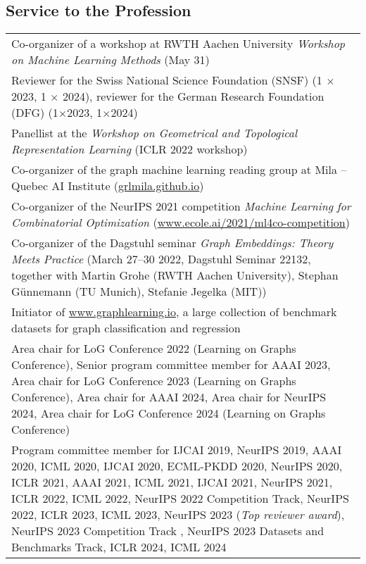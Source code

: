 \documentclass[11pt, a4paper, DIV=14, headings=small]{scrartcl}
\begin{document}
	\subsection*{Service to the Profession}
	\begin{longtabu}{p{14.5cm}} 
		Co-organizer of a workshop at RWTH Aachen University \emph{Workshop on Machine Learning Methods} (May 31) \\
	
	    Reviewer for the Swiss National Science Foundation (SNSF) (1 $\times$ 2023, 1 $\times$ 2024), reviewer for the German Research Foundation (DFG) (1$\times$2023, 1$\times$2024) \\[2.5em]
	    
		Panellist at the \emph{Workshop on Geometrical and Topological Representation Learning} (ICLR 2022 workshop) \\
		Co-organizer of the graph machine learning reading group at Mila -- Quebec AI Institute (\url{grlmila.github.io}) \\
		
		Co-organizer of the NeurIPS 2021 competition \emph{Machine Learning for Combinatorial Optimization} (\url{www.ecole.ai/2021/ml4co-competition}) \\
		
		Co-organizer of the Dagstuhl seminar \emph{Graph Embeddings: Theory Meets Practice} (March 27–30 2022, Dagstuhl Seminar 22132, together with Martin Grohe (RWTH Aachen University), Stephan Günnemann (TU Munich), Stefanie Jegelka (MIT)) \\
		
		Initiator of \url{www.graphlearning.io}, a large collection of benchmark datasets for graph classification and regression \\
		
		Area chair for LoG Conference 2022 (Learning on Graphs Conference), Senior program committee member for AAAI 2023, Area chair for LoG Conference 2023 (Learning on Graphs Conference), Area chair for AAAI 2024, Area chair for NeurIPS 2024, Area chair for LoG Conference 2024 (Learning on Graphs Conference) \\
		
		Program committee member for IJCAI 2019, NeurIPS  2019, AAAI 2020, ICML 2020, IJCAI 2020, ECML-PKDD 2020, NeurIPS 2020, ICLR 2021, AAAI 2021, ICML 2021, IJCAI 2021, NeurIPS 2021, ICLR 2022, ICML 2022, NeurIPS 2022 Competition Track, NeurIPS 2022, ICLR 2023, ICML 2023, NeurIPS 2023 (\emph{Top reviewer award}), NeurIPS 2023 Competition Track , NeurIPS 2023 Datasets and Benchmarks Track, ICLR 2024, ICML 2024 \\
		

\end{longtabu}
\end{document}
